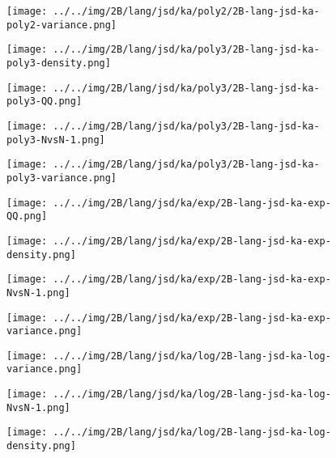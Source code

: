 \begin{figure}[H]
\centering	\texttt{[image: ../../img/2B/lang/jsd/ka/poly2/2B-lang-jsd-ka-poly2-variance.png]}
\end{figure}
\begin{figure}[H]
\centering	\texttt{[image: ../../img/2B/lang/jsd/ka/poly3/2B-lang-jsd-ka-poly3-density.png]}
\end{figure}
\begin{figure}[H]
\centering	\texttt{[image: ../../img/2B/lang/jsd/ka/poly3/2B-lang-jsd-ka-poly3-QQ.png]}
\end{figure}
\begin{figure}[H]
\centering	\texttt{[image: ../../img/2B/lang/jsd/ka/poly3/2B-lang-jsd-ka-poly3-NvsN-1.png]}
\end{figure}
\begin{figure}[H]
\centering	\texttt{[image: ../../img/2B/lang/jsd/ka/poly3/2B-lang-jsd-ka-poly3-variance.png]}
\end{figure}
\begin{figure}[H]
\centering	\texttt{[image: ../../img/2B/lang/jsd/ka/exp/2B-lang-jsd-ka-exp-QQ.png]}
\end{figure}
\begin{figure}[H]
\centering	\texttt{[image: ../../img/2B/lang/jsd/ka/exp/2B-lang-jsd-ka-exp-density.png]}
\end{figure}
\begin{figure}[H]
\centering	\texttt{[image: ../../img/2B/lang/jsd/ka/exp/2B-lang-jsd-ka-exp-NvsN-1.png]}
\end{figure}
\begin{figure}[H]
\centering	\texttt{[image: ../../img/2B/lang/jsd/ka/exp/2B-lang-jsd-ka-exp-variance.png]}
\end{figure}
\begin{figure}[H]
\centering	\texttt{[image: ../../img/2B/lang/jsd/ka/log/2B-lang-jsd-ka-log-variance.png]}
\end{figure}
\begin{figure}[H]
\centering	\texttt{[image: ../../img/2B/lang/jsd/ka/log/2B-lang-jsd-ka-log-NvsN-1.png]}
\end{figure}
\begin{figure}[H]
\centering	\texttt{[image: ../../img/2B/lang/jsd/ka/log/2B-lang-jsd-ka-log-density.png]}
\end{figure}
